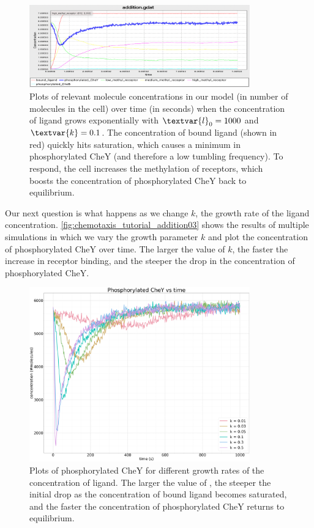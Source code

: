 \begin{figure}[h]
\centering
\mySfFamily
\includegraphics[width = 0.85\textwidth]{../images/chemotaxis_tutorial_addition01.png}
\caption{Plots of relevant molecule concentrations in our model (in number of molecules in the cell) over time (in seconds) when the concentration of ligand grows exponentially with $\textvar{l}_\text{0} = \text{1000}$ and $\textvar{k} = \text{0.1}$. The concentration of bound ligand (shown in red) quickly hits saturation, which causes a minimum in phosphorylated CheY (and therefore a low tumbling frequency). To respond, the cell increases the methylation of receptors, which boosts the concentration of phosphorylated CheY back to equilibrium.}
\label{fig:chemotaxis_tutorial_addition01}
\end{figure}


Our next question is what happens as we change $k$, the growth rate of the ligand concentration. \autoref{fig:chemotaxis_tutorial_addition03} shows the results of multiple simulations in which we vary the growth parameter $k$ and plot the concentration of phosphorylated CheY over time. The larger the value of $k$, the faster the increase in receptor binding, and the steeper the drop in the concentration of phosphorylated CheY.\\

\begin{figure}[h]
\centering
\mySfFamily
\includegraphics[width = 0.85\textwidth]{../images/chemotaxis_tutorial_addition03.png}
\caption{Plots of phosphorylated CheY for different growth rates  of the concentration of ligand. The larger the value of , the steeper the initial drop as the concentration of bound ligand becomes saturated, and the faster the concentration of phosphorylated CheY returns to equilibrium.}
\label{fig:chemotaxis_tutorial_addition03}
\end{figure}

